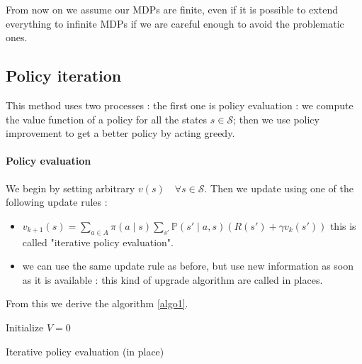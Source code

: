 \documentclass[14pt,a4paper]{article}
\theoremstyle{definition}
\begin{document}
From now on we assume our MDPs are finite, even if it is possible to extend everything to infinite MDPs if we are careful enough to avoid the problematic ones. \citep{Sutton}

\subsection{Policy iteration}

This method uses two processes : the first one is policy evaluation : we compute the value function of a policy for all the states $s \in \mathcal{S} $; then we use policy improvement to get a better policy by acting greedy.
\paragraph{Policy evaluation} 


We begin by setting arbitrary $v(s) \quad \forall s \in \mathcal{S}$.
Then we update using one of the following update rules : 

\begin{itemize}
\item $v_{k+1}(s)=\underset{a \in A}{\sum}\pi(a \mid s)\underset{s'}{\sum}\mathbb{P}(s'\mid a,s)(R(s')+\gamma v_k(s'))$ \quad this is called "iterative policy evaluation".
\item we can use the same update rule as before, but use new information as soon as it is available : this kind of upgrade algorithm are called in places.
\end{itemize}

From this we derive the algorithm \ref{algo1}.


\begin{algorithm}


    Initialize $V = 0$\\
    
    \caption{Iterative policy evaluation (in place)}
    \label{algo1}
\end{algorithm}
\end{document}
